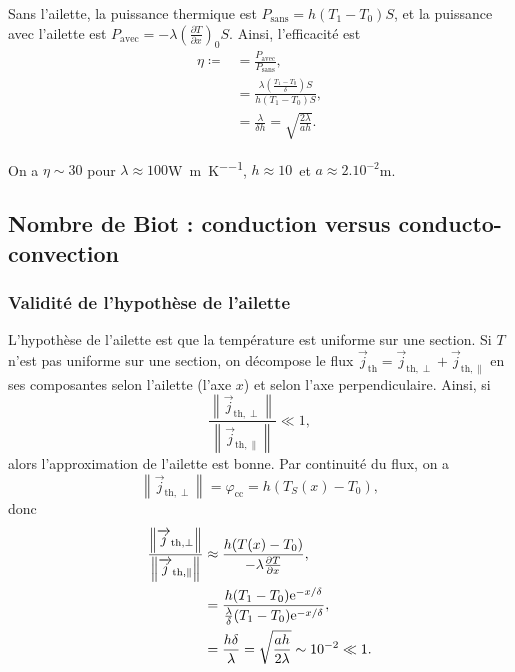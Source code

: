             Sans l'ailette, la puissance thermique est $P_{\text{sans}}=h(T_1-T_0)S$, et la puissance avec l'ailette est $P_{\text{avec}}=-\lambda\left(\frac{\partial T}{\partial x}\right)_{0}S$. Ainsi, l'efficacité est 
            \begin{align*}
                \eta\coloneqq
                &=
                \frac{P_{\text{avec}}}{P_{\text{sans}}},\\
                &=
                \frac{\lambda\left(\frac{T_1-T_0}{\delta}\right)S}{h(T_1-T_0)S},\\
                &=
                \frac{\lambda}{\delta h}=\sqrt{\frac{2\lambda}{ah}}.
            \end{align*}

            On a $\eta\sim 30$ pour $\lambda\approx100$\si[]{\watt\per\metre\per\kelvin}, $h\approx10$\si[]{\watt\per\metre\square} et $a\approx2.10^{-2}$\si[]{\metre}.

    \subsection[Nombre de Biot]{Nombre de Biot : conduction versus conducto-convection}
        \subsubsection{Validité de l'hypothèse de l'ailette}
            L'hypothèse de l'ailette est que la température est uniforme sur une section. Si $T$ n'est pas uniforme sur une section, on décompose le flux $\vec{j}_{\text{th}}=\vec{j}_{\text{th},\perp}+\vec{j}_{\text{th},\parallel}$ en ses composantes selon l'ailette (l'axe $x$) et selon l'axe perpendiculaire. Ainsi, si 
            \begin{equation*}
                \frac{\left\lVert\vec{j}_{\text{th},\perp}\right\rVert}{\left\lVert\vec{j}_{\text{th},\parallel}\right\rVert}\ll1,
            \end{equation*}
            alors l'approximation de l'ailette est bonne. Par continuité du flux, on a 
            \begin{equation*}
                \left\lVert\vec{j}_{\text{th},\perp}\right\rVert=\varphi_{\text{cc}}=h(T_S(x)-T_0),
            \end{equation*}
            donc
            \begin{align*}
                \frac{\left\lVert\protect\overrightarrow{{j}}_{\text{th},\perp}\right\rVert}{\left\lVert\protect\overrightarrow{{j}}_{\text{th},\parallel}\right\rVert}
                &\approx
                \frac{h(T(x)-T_0)}{-\lambda\frac{\partial T}{\partial x}},\\
                &=
                \frac{h(T_1-T_0)\mathrm{e}^{-x/\delta}}{\frac{\lambda}{\delta}(T_1-T_0)\mathrm{e}^{-x/\delta}},\\
                &=
                \frac{h\delta}{\lambda}=\sqrt{\frac{ah}{2\lambda}}\sim10^{-2}\ll1.
            \end{align*}


